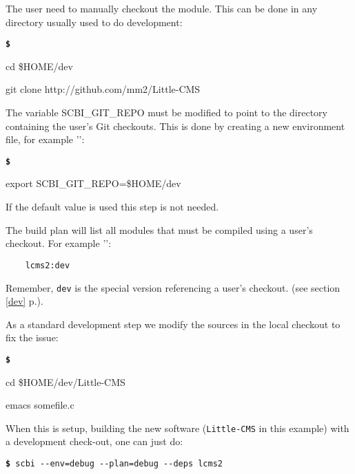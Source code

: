 \documentclass[a4paper,12pt,twoside]{article}
\newenvironment{shellcommand}{
	\begin{list}{ %
			\bfseries\texttt \$
		}{ %
			\ttfamily
			\setlength{\topsep}{-0.3ex}
			\setlength{\labelwidth}{1in}
			\setlength{\leftmargin}{0.7in}
			\setlength{\labelsep}{0.5ex}
			\setlength{\rightmargin}{0.5in}
			\setlength{\itemsep}{1ex}
			\setlength{\parsep}{0ex}
			\setlength{\listparindent}{0.5in}
		}
	}{
	\end{list}
}
\newcommand{\code}[1]{\texttt{#1}}
\newcommand{\seeref}[1]{see section \ref{#1} p.\pageref{#1}}
\newcommand{\file}[1]{'{\path{#1}}'}
\newcommand{\cmd}[1]{\tabto{1cm}\hspace{0.5cm}\texttt{\textbf{\$} #1}}
\newcommand{\ddash}{-{}-}
\begin{document}
\begin{description}[style=nextline]
	\item[Checkout the module] The user need to manually checkout the module. This can be done in any directory usually used to do development:

	\begin{shellcommand}
	\item cd \$HOME/dev
	\item git clone http://github.com/mm2/Little-CMS
	\end{shellcommand}

	\item[Setup SCBI enviroment] The variable SCBI\_GIT\_REPO must be modified to point to the directory containing the user's Git checkouts. This is done by creating a new environment file, for example \file{.env-debug}:

	\begin{shellcommand}
	\item export SCBI\_GIT\_REPO=\$HOME/dev
	\end{shellcommand}

	If the default value is used this step is not needed.

	\item[Create a build plan] The build plan will list all modules that must be compiled using a user's checkout. For example \file{.plan-debug}:

	\begin{lstlisting}
	lcms2:dev
	\end{lstlisting}

	Remember, \code{dev} is the special version referencing a user's checkout. (\seeref{dev}).

	\item[Modify the module's sources] As a standard development step we modify the sources in the local checkout to fix the issue:

	\begin{shellcommand}
	\item cd \$HOME/dev/Little-CMS
	\item emacs somefile.c
	\end{shellcommand}

\end{description}

When this is setup, building the new software (\code{Little-CMS} in this example) with a development check-out, one can just do:

\cmd{scbi \ddash{}env=debug \ddash{}plan=debug \ddash{}deps lcms2}
\end{document}
